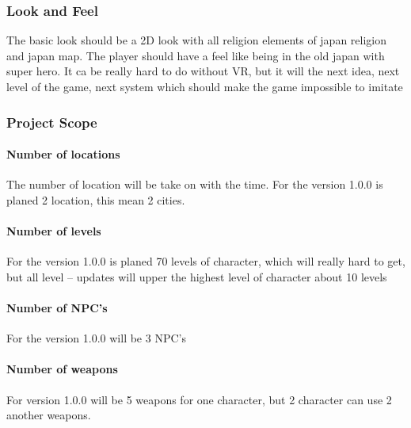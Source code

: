 \documentclass[parskip=full]{scrartcl}
\begin{document}
				\subsubsection{Look and Feel} \vspace{-5mm}
					\par \begingroup
					\leftskip=2cm
					\noindent
							The basic look should be a 2D look with all religion elements of japan religion and japan map. The player should have a feel like being in the old japan with super hero. It ca be really hard to do without VR, but it will the next idea, next level of the game, next system which should make the game impossible to imitate
					\par \endgroup
				\subsubsection{Project Scope} \vspace{-5mm}
					\paragraph{Number of locations} \vspace{-5mm}
						\par \begingroup
						\leftskip=2cm
						\noindent
								The number of location will be take on with the time. For the version 1.0.0 is planed 2 location, this mean 2 cities.
						\par \endgroup
					\paragraph{Number of levels} \vspace{-5mm}
						\par \begingroup
						\leftskip=2cm
						\noindent
								For the version 1.0.0 is planed 70 levels of character, which will really hard to get, but all level – updates will upper the highest level of character about 10 levels
						\par \endgroup
					\paragraph{Number of NPC’s} \vspace{-5mm}
						\par \begingroup
						\leftskip=2cm
						\noindent
								For the version 1.0.0 will be 3 NPC’s
						\par \endgroup
					\paragraph{Number of weapons} \vspace{-5mm}
						\par \begingroup
						\leftskip=2cm
						\noindent
								For version 1.0.0 will be 5 weapons for one character, but 2 character can use 2 another weapons.
						\par \endgroup
\end{document}
